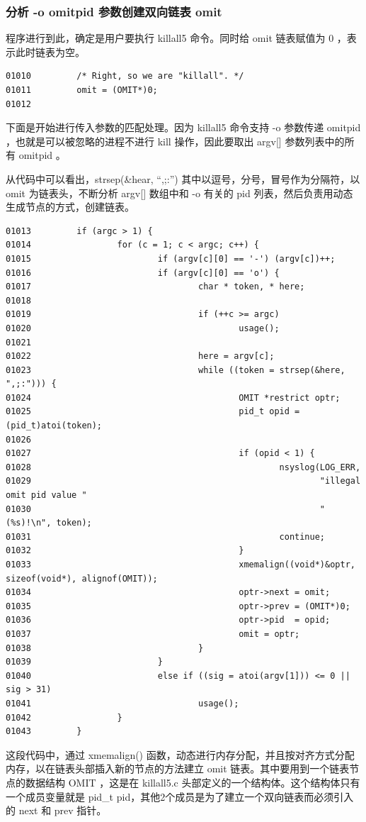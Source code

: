 \subsubsection{分析 -o omitpid 参数创建双向链表 omit}

程序进行到此，确定是用户要执行 killall5 命令。同时给 omit 链表赋值为 0
，表示此时链表为空。

{\begin{shaded}\begin{verbatim}
01010         /* Right, so we are "killall". */
01011         omit = (OMIT*)0;
01012 
\end{verbatim}\end{shaded}}
下面是开始进行传入参数的匹配处理。因为 killall5 命令支持 -o 参数传递
omitpid ，也就是可以被忽略的进程不进行 kill 操作，因此要取出 argv{[}{]}
参数列表中的所有 omitpid 。

从代码中可以看出，strsep(\&hear, ``,;:'')
其中以逗号，分号，冒号作为分隔符，以 omit 为链表头，不断分析 argv{[}{]}
数组中和 -o 有关的 pid 列表，然后负责用动态生成节点的方式，创建链表。

{\begin{shaded}\begin{verbatim}
01013         if (argc > 1) {
01014                 for (c = 1; c < argc; c++) {
01015                         if (argv[c][0] == '-') (argv[c])++;
01016                         if (argv[c][0] == 'o') {
01017                                 char * token, * here;
01018 
01019                                 if (++c >= argc)
01020                                         usage();
01021 
01022                                 here = argv[c];
01023                                 while ((token = strsep(&here, ",;:"))) {
01024                                         OMIT *restrict optr;
01025                                         pid_t opid = (pid_t)atoi(token);
01026 
01027                                         if (opid < 1) {
01028                                                 nsyslog(LOG_ERR,
01029                                                         "illegal omit pid value "
01030                                                         "(%s)!\n", token);
01031                                                 continue;
01032                                         }
01033                                         xmemalign((void*)&optr, sizeof(void*), alignof(OMIT));
01034                                         optr->next = omit;
01035                                         optr->prev = (OMIT*)0;
01036                                         optr->pid  = opid;
01037                                         omit = optr;
01038                                 }
01039                         }
01040                         else if ((sig = atoi(argv[1])) <= 0 || sig > 31)
01041                                 usage();
01042                 }
01043         }
\end{verbatim}\end{shaded}}
这段代码中，通过 xmemalign()
函数，动态进行内存分配，并且按对齐方式分配内存，以在链表头部插入新的节点的方法建立
omit 链表。其中要用到一个链表节点的数据结构 OMIT ，这是在 killall5.c
头部定义的一个结构体。这个结构体只有一个成员变量就是 pid\_t
pid，其他2个成员是为了建立一个双向链表而必须引入的 next 和 prev 指针。

